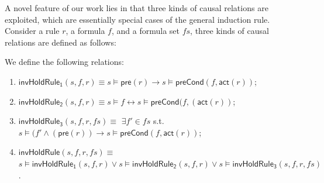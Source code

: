 \documentclass[final]{IEEEtran}
\newlength{\fminilength}
\newenvironment{fmini}[1][\linewidth]
  {\setlength{\fminilength}{#1\fboxsep-2\fboxrule}%
   \vspace{2ex}\noindent\begin{lrbox}{\fminibox}\begin{minipage}{\fminilength}%
   \mbox{ }\hfill\vspace{-2.5ex}}%
  {\end{minipage}\end{lrbox}\vspace{1ex}\hspace{0ex}%
   \framebox{\usebox{\fminibox}}}
\newenvironment{specification}
{\noindent\scriptsize
\tt\begin{fmini}\begin{tabbing}X\=X12345\=XXXX\=XXXX\=XXXX\=XXXX\=XXXX
\=\+\kill} {\end{tabbing}\normalfont\end{fmini}}
\def \andc {\wedge }
\newcommand{\forget}[1]{}
\begin{document}
{A novel feature of our work lies in that three kinds of causal
relations are exploited, which are essentially special cases of the
general induction rule.  Consider a rule $r$, a formula $f$, and a formula set $fs$, three
 kinds of causal relations are defined as follows:
 \begin{definition}
We define the following relations:
\forget{$\mathsf{invHoldRule_1}::state \times formula\times rule \Rightarrow bool$, $\mathsf{invHoldRule_2}::state\times  formula\times rule  \Rightarrow bool$,  $\mathsf{invHoldRule_3}::state \times formula\times rule \times rule set\Rightarrow bool$, and $\mathsf{invHoldRule}::state \times formula\times rule \times rule set\Rightarrow bool$.}
\vspace{-0.2cm}
\begin{enumerate}
\item $\mathsf{invHoldRule_1} (s,f,r) \equiv $$s \models \mathsf{pre}(r) \longrightarrow s \models \mathsf{preCond}(f ,\mathsf{act}(r))$;
\item $\mathsf{invHoldRule_2}(s,f,r) \equiv  $$s \models f \longleftrightarrow s \models \mathsf{preCond}( f,(\mathsf{act}( r))$;
\item $\mathsf{invHoldRule_3}(s,f,r,fs) \equiv$  $\exists f' \in fs$ s.t.
$s \models ( f' \andc (\mathsf{pre}(r))  \longrightarrow s \models \mathsf{preCond}(f ,\mathsf{act}(r))$;
\item $\mathsf{invHoldRule}(s,f,r, fs) \equiv$   $s \models\mathsf{invHoldRule_1}(s,f,r) \vee s\models\mathsf{invHoldRule_2}(s,f,r) \vee s\models \mathsf{invHoldRule_3}(s,f,r,fs)$.
\end{enumerate}
\end{definition}
\vspace{-0.2cm}


}
\end{document}
